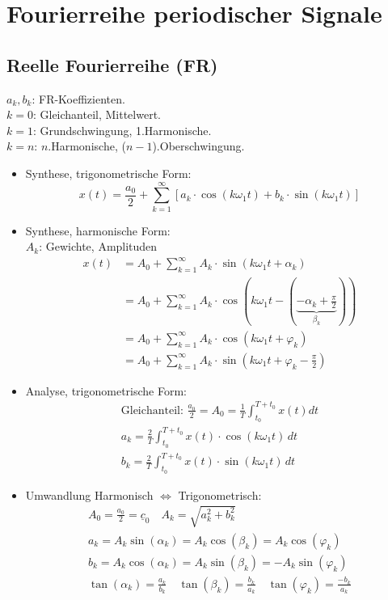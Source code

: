 \newpage
\section{Fourierreihe periodischer Signale}
\subsection{Reelle Fourierreihe (FR)}
		
{\small $a_k, b_k$: FR-Koeffizienten.\\
	$k=0$: Gleichanteil, Mittelwert.\\
	$k=1$: Grundschwingung, 1.Harmonische.\\
	$k=n$: $n$.Harmonische, ($n-1$).Oberschwingung.}
	\begin{itemize}
		\item Synthese, trigonometrische Form:
		      \[
			      x(t) = \frac{a_0}{2} + \sum_{k=1}^\infty [a_k\cdot \cos(k\omega_1 t)+ b_k\cdot \sin(k\omega_1 t)]
		      \]
		\item Synthese, harmonische Form:\\
				{\small $A_k$: Gewichte, Amplituden}
		      \begin{align*}
			      x(t) & = A_0+\sum_{k=1}^\infty A_k\cdot \sin (k\omega_1 t + \alpha_k)              \\
			           & = A_0+\sum_{k=1}^\infty A_k\cdot \cos (k\omega_1 t -( \underbrace{-\alpha_k+\frac{\pi}{2} }_{\beta_k}))\\
			           & = \boxed{A_0+\sum_{k=1}^\infty A_k\cdot \cos (k\omega_1 t + \varphi_k)}\\
  			           & = A_0+\sum_{k=1}^\infty A_k \cdot \sin (k\omega_1 t + \varphi_k - \frac{\pi}{2})
		      \end{align*}

		\item Analyse, trigonometrische Form:
		\begin{gather*}
		      	\text{Gleichanteil: }\frac{a_0}{2}= A_0 = \frac{1}{T}\int_{t_0}^{T+t_0} x(t)dt\\
			      a_k = \frac{2}{T}\int_{t_0}^{T+t_0} x(t)\cdot \cos(k\omega_1 t)\,dt \\
			      b_k = \frac{2}{T}\int_{t_0}^{T+t_0} x(t)\cdot \sin(k\omega_1 t)\,dt
		\end{gather*}
		\item Umwandlung Harmonisch $\Leftrightarrow$ Trigonometrisch:
		\begin{gather*}
			A_0 = \frac{a_0}{2} = \underline{c}_0 \quad
			A_k = \sqrt{a_k^2+b_k^2}\\
			a_k = A_k \sin(\alpha_k) = A_k \cos(\beta_k) = A_k \cos(\varphi_k)\\
			b_k = A_k \cos(\alpha_k) = A_k \sin(\beta_k) = - A_k \sin(\varphi_k)\\
			\tan(\alpha_k)=\frac{a_k}{b_k} \quad \tan(\beta_k)=\frac{b_k}{a_k} \quad \tan(\varphi_k)=\frac{-b_k}{a_k}
		\end{gather*}
	\end{itemize}

